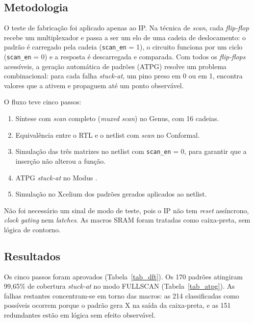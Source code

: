 \documentclass[conference]{IEEEtran}
\begin{document}
\subsection{Metodologia}
O teste de fabricação foi aplicado apenas ao IP. Na técnica de \textit{scan}, cada \textit{flip-flop} recebe um multiplexador e passa a ser um elo de uma cadeia de deslocamento: o padrão é carregado pela cadeia (\texttt{scan\_en} = 1), o circuito funciona por um ciclo (\texttt{scan\_en} = 0) e a resposta é descarregada e comparada. Com todos os \textit{flip-flops} acessíveis, a geração automática de padrões (ATPG) resolve um problema combinacional: para cada falha \textit{stuck-at}, um pino preso em 0 ou em 1, encontra valores que a ativem e propaguem até um ponto observável.

O fluxo teve cinco passos:
\begin{enumerate}
    \item Síntese com \textit{scan} completo (\textit{muxed scan}) no Genus, com 16 cadeias.
    \item Equivalência entre o RTL e o netlist com \textit{scan} no Conformal.
    \item Simulação das três matrizes no netlist com \texttt{scan\_en} = 0, para garantir que a inserção não alterou a função.
    \item ATPG \textit{stuck-at} no Modus \cite{b12}.
    \item Simulação no Xcelium dos padrões gerados aplicados ao netlist.
\end{enumerate}
Não foi necessário um sinal de modo de teste, pois o IP não tem \textit{reset} assíncrono, \textit{clock gating} nem \textit{latches}. As macros SRAM foram tratadas como caixa-preta, sem lógica de contorno.

\subsection{Resultados}
Os cinco passos foram aprovados (Tabela~\ref{tab_dft}). Os 170 padrões atingiram 99,65\% de cobertura \textit{stuck-at} no modo FULLSCAN (Tabela~\ref{tab_atpg}). As falhas restantes concentram-se em torno das macros: as 214 classificadas como possíveis ocorrem porque o padrão gera X na saída da caixa-preta, e as 151 redundantes estão em lógica sem efeito observável.
\end{document}
